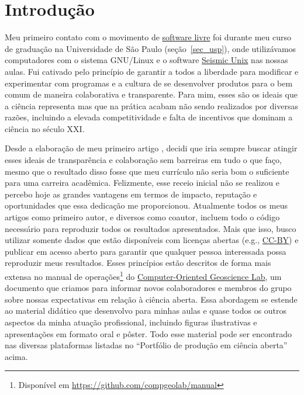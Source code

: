 \documentclass[10pt,a4paper,oneside]{book}
\begin{document}
\section{Introdução}

Meu primeiro contato com o movimento de \href{https://www.fsf.org/}{software livre}
foi durante meu curso de graduação na Universidade de São Paulo (seção~\ref{sec_usp}),
onde utilizávamos computadores com o sistema GNU/Linux e o software
\href{https://en.wikipedia.org/wiki/Seismic_Unix}{Seismic Unix} nas nossas aulas.
Fui cativado pelo princípio de garantir a todos a liberdade para modificar e
experimentar com programas e a cultura de se desenvolver produtos para o bem
comum de maneira colaborativa e transparente.
Para mim, esses são os ideais que a ciência representa mas que na prática acabam
não sendo realizados por diversas razões, incluindo a elevada competitividade
e falta de incentivos que dominam a ciência no século XXI.

Desde a elaboração de meu primeiro artigo \citep{Uieda2012}, decidi que iria
sempre buscar atingir esses ideais de transparência e colaboração sem barreiras
em tudo o que faço, mesmo que o resultado disso fosse que meu currículo não
seria bom o suficiente para uma carreira acadêmica.
Felizmente, esse receio inicial não se realizou e percebo hoje as grandes
vantagens em termos de impacto, reputação e oportunidades que essa dedicação me
proporcionou.
Atualmente todos os meus artigos como primeiro autor, e diversos como coautor,
incluem todo o código necessário para reproduzir todos os resultados
apresentados.
Mais que isso, busco utilizar somente dados que estão disponíveis com
licenças abertas (e.g., \href{https://creativecommons.org/licenses/by/4.0/}{CC-BY})
e publicar em acesso aberto para garantir que qualquer pessoa interessada
possa reproduzir meus resultados.
Esses princípios estão descritos de forma mais extensa no manual de operações\footnote{Disponível
em \url{https://github.com/compgeolab/manual}}
do \href{https://www.compgeolab.org/}{Computer-Oriented Geoscience Lab},
um documento que criamos para informar novos colaboradores e membros
do grupo sobre nossas expectativas em relação à ciência aberta.
Essa abordagem se estende ao material didático que desenvolvo para minhas aulas
e quase todos os outros aspectos da minha atuação profissional, incluindo
figuras ilustrativas e apresentações em formato oral e pôster.
Todo esse material pode ser encontrado nas diversas plataformas listadas no
``Portfólio de produção em ciência aberta'' acima.
\end{document}
